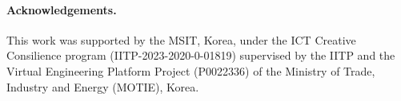 \documentclass[10pt,twocolumn,letterpaper]{article}
\begin{document}
%
 
\paragraph{Acknowledgements.}
This work was supported by the MSIT, Korea, under the ICT Creative Consilience program (IITP-2023-2020-0-01819) supervised by the IITP and the Virtual Engineering Platform Project  (P0022336) of the Ministry of Trade, Industry and Energy (MOTIE), Korea.



{\small


}
\end{document}

